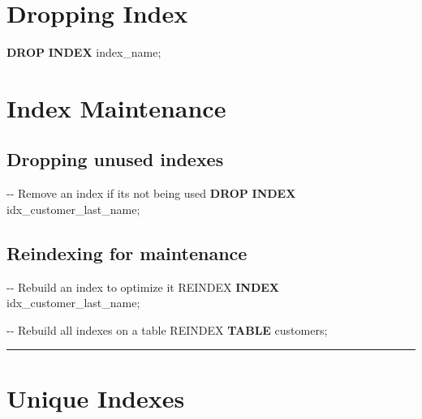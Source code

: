 \documentclass[
]{report}
\newenvironment{Shaded}{\begin{snugshade}}{\end{snugshade}}
\newcommand{\CommentTok}[1]{\textcolor[rgb]{0.37,0.37,0.37}{#1}}
\newcommand{\KeywordTok}[1]{\textcolor[rgb]{0.00,0.23,0.31}{\textbf{#1}}}
\newcommand{\NormalTok}[1]{\textcolor[rgb]{0.00,0.23,0.31}{#1}}
\begin{document}
\section{Dropping Index}\label{dropping-index}

\begin{Shaded}
\begin{Highlighting}[]
\KeywordTok{DROP} \KeywordTok{INDEX}\NormalTok{ index\_name;}
\end{Highlighting}
\end{Shaded}

\section{Index Maintenance}\label{index-maintenance}

\subsection{Dropping unused indexes}\label{dropping-unused-indexes}

\begin{Shaded}
\begin{Highlighting}[]
\CommentTok{{-}{-} Remove an index if it\textquotesingle{}s not being used}
\KeywordTok{DROP} \KeywordTok{INDEX}\NormalTok{ idx\_customer\_last\_name;}
\end{Highlighting}
\end{Shaded}

\subsection{Reindexing for
maintenance}\label{reindexing-for-maintenance}

\begin{Shaded}
\begin{Highlighting}[]
\CommentTok{{-}{-} Rebuild an index to optimize it}
\NormalTok{REINDEX }\KeywordTok{INDEX}\NormalTok{ idx\_customer\_last\_name;}

\CommentTok{{-}{-} Rebuild all indexes on a table}
\NormalTok{REINDEX }\KeywordTok{TABLE}\NormalTok{ customers;}
\end{Highlighting}
\end{Shaded}

\begin{center}\rule{0.5\linewidth}{0.5pt}\end{center}

\section{Unique Indexes}\label{unique-indexes}
\end{document}
